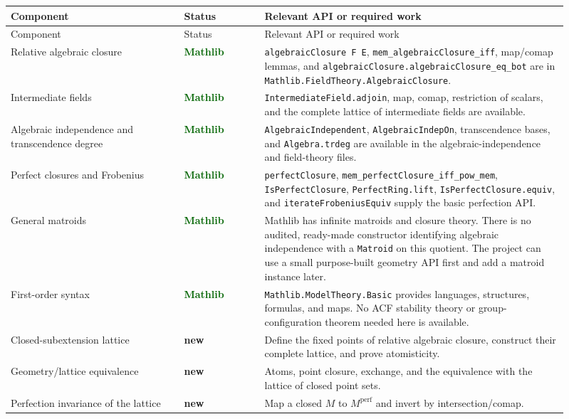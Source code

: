 \documentclass[11pt,oneside]{article}
\theoremstyle{definition}
\theoremstyle{remark}
\newcommand{\lean}[1]{\nolinkurl{#1}}
\newcommand{\statusmathlib}{\textcolor{darkgreen}{\textbf{Mathlib}}}
\newcommand{\statusnew}{\textcolor{brick}{\textbf{new}}}
\begin{document}
\begin{longtable}{>{\raggedright\arraybackslash}p{0.29\linewidth}
                  >{\raggedright\arraybackslash}p{0.13\linewidth}
                  >{\raggedright\arraybackslash}p{0.49\linewidth}}
\toprule
Component & Status & Relevant API or required work\\
\midrule
\endfirsthead
\toprule
Component & Status & Relevant API or required work\\
\midrule
\endhead
Relative algebraic closure & \statusmathlib &
\lean{algebraicClosure F E}, \lean{mem_algebraicClosure_iff}, map/comap lemmas,
and \lean{algebraicClosure.algebraicClosure_eq_bot} are in
\lean{Mathlib.FieldTheory.AlgebraicClosure}.\\
Intermediate fields & \statusmathlib &
\lean{IntermediateField.adjoin}, map, comap, restriction of scalars, and the complete
lattice of intermediate fields are available.\\
Algebraic independence and transcendence degree & \statusmathlib &
\lean{AlgebraicIndependent}, \lean{AlgebraicIndepOn}, transcendence bases, and
\lean{Algebra.trdeg} are available in the algebraic-independence and field-theory files.\\
Perfect closures and Frobenius & \statusmathlib &
\lean{perfectClosure}, \lean{mem_perfectClosure_iff_pow_mem},
\lean{IsPerfectClosure}, \lean{PerfectRing.lift},
\lean{IsPerfectClosure.equiv}, and \lean{iterateFrobeniusEquiv} supply the basic
perfection API.\\
General matroids & \statusmathlib &
Mathlib has infinite matroids and closure theory.  There is no audited, ready-made
constructor identifying algebraic independence with a \lean{Matroid} on this quotient.
The project can use a small purpose-built geometry API first and add a matroid instance
later.\\
First-order syntax & \statusmathlib &
\lean{Mathlib.ModelTheory.Basic} provides languages, structures, formulas, and maps.
No ACF stability theory or group-configuration theorem needed here is available.\\
Closed-subextension lattice & \statusnew &
Define the fixed points of relative algebraic closure, construct their complete lattice,
and prove atomisticity.\\
Geometry/lattice equivalence & \statusnew &
Atoms, point closure, exchange, and the equivalence with the lattice of closed point sets.\\
Perfection invariance of the lattice & \statusnew &
Map a closed $M$ to $M^{\mathrm{perf}}$ and invert by intersection/comap.\\

\end{longtable}
\end{document}
